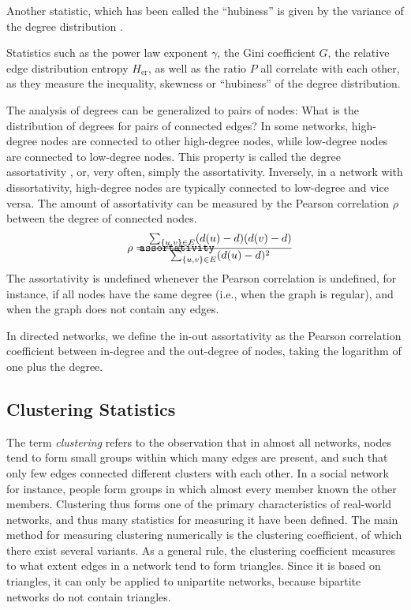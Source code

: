 \documentclass{article}
\def\mathnote#1{%
  \tag*{\rlap{\hspace\marginparsep\smash{\parbox[t]{\marginparwidth}{#1}}}}
}
\begin{document}
Another statistic, which has been called the ``hubiness'' is given by
the variance of the degree distribution \cite[e.g. by][]{b883,b884}.

Statistics such as the power law exponent $\gamma$, the Gini coefficient
$G$, the relative edge distribution entropy $H_{\mathrm{er}}$, as well
as the ratio $P$ all correlate with each other, as they measure the
inequality, skewness or ``hubiness'' of the degree distribution. 

The analysis of degrees can be generalized to pairs of nodes:  What is
the distribution of degrees for pairs of connected edges?  In some
networks, high-degree nodes are connected to other high-degree nodes,
while low-degree nodes are connected to low-degree nodes.  This property
is called the degree assortativity \citep{b854}, or, very often, simply the
assortativity.  Inversely, in a network with dissortativity,  
high-degree nodes are typically connected to low-degree and vice versa.
The amount of assortativity can be measured by the Pearson correlation
$\rho$ between the degree of connected nodes.  
\begin{align}
  \mathnote{\texttt{assortativity}} 
  \rho &= \frac
  {\sum_{\{u,v\} \in E} (d(u) - d)(d(v) - d)}
  {\sum_{\{u,v\} \in E} (d(u) - d)^2}
\end{align}
The assortativity is
undefined whenever the Pearson correlation is undefined, for instance,
if all nodes have the same degree (i.e., when the graph is regular), and
when the graph does not contain any edges. 

In directed networks, we define the in-out assortativity as the Pearson
correlation coefficient between in-degree and the out-degree of nodes,
taking the logarithm of one plus the degree.

\subsection{Clustering Statistics}
\label{sec:statistic:clustering}
The term \emph{clustering} refers to the observation that in almost all
networks, nodes tend to form small groups within which many edges are
present, and such that only few edges connected different clusters with
each other.  In a social network for instance, people form groups in
which almost every member known the other members.  Clustering thus
forms one of the primary characteristics of real-world networks, and
thus many statistics for measuring it have been defined.  The main
method for measuring clustering numerically is the clustering
coefficient, of which there exist several variants. As a general rule,
the clustering coefficient measures to what extent edges in a network
tend to form triangles. Since it is based on triangles, it can only be
applied to unipartite networks, because bipartite networks do not
contain triangles.
\end{document}
